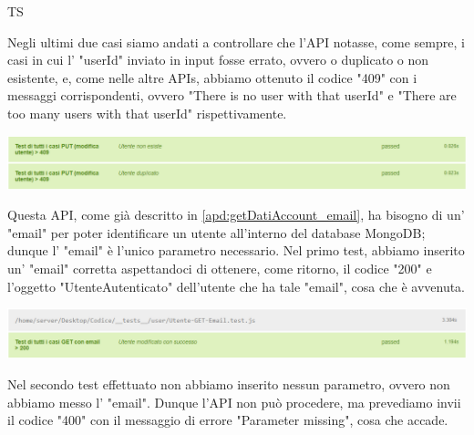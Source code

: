 \begin{listaPersonale}{TS}
\begin{center}
                \end{center}
                Negli ultimi due casi siamo andati a controllare che l'API notasse, come sempre, i casi in cui l' "userId" inviato in input fosse errato, ovvero o duplicato o non esistente, e, come nelle altre APIs, abbiamo ottenuto il codice "409" con i messaggi corrispondenti, ovvero "There is no user with that userId" e "There are too many users with that userId" rispettivamente.
                \begin{center}
                        \includegraphics[width=1\textwidth, height=0.08\textheight]{img/png/tests/UtentePut/409_userId_putUtente.png}
                \end{center}
                Questa API, come già descritto in \ref{apd:getDatiAccount_email}, ha bisogno di un' "email" per poter identificare un utente all'interno del database MongoDB; dunque l' "email" è l'unico parametro necessario. Nel primo test, abbiamo inserito un' "email" corretta aspettandoci di ottenere, come ritorno, il codice "200" e l'oggetto "UtenteAutenticato" dell'utente che ha tale "email", cosa che è avvenuta.
                \begin{center}
                        \includegraphics[width=1\textwidth, height=0.08\textheight]{img/png/tests/UtenteGet_email/200_getUtente_email.png}
                \end{center}
                Nel secondo test effettuato non abbiamo inserito nessun parametro, ovvero non abbiamo messo l' "email". Dunque l'API non può procedere, ma prevediamo invii il codice "400" con il messaggio di errore "Parameter missing", cosa che accade.

\end{listaPersonale}
